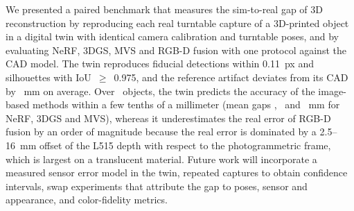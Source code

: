 We presented a paired benchmark that measures the sim-to-real gap of 3D reconstruction by reproducing each
real turntable capture of a 3D-printed object in a digital twin with identical camera calibration and
turntable poses, and by evaluating NeRF, 3DGS, MVS and RGB-D fusion with one protocol against the CAD model.
The twin reproduces fiducial detections within 0.11~px and silhouettes with IoU~$\geq$~0.975, and the
reference artifact deviates from its CAD by \printmae~mm on average. Over \nobj\ objects, the twin predicts
the accuracy of the image-based methods within a few tenths of a millimeter (mean gaps \nerfD, \gsD\ and
\mvsD~mm for NeRF, 3DGS and MVS), whereas it underestimates the real error of RGB-D fusion by an order of
magnitude because the real error is dominated by a 2.5--16~mm offset of the L515 depth with respect to the
photogrammetric frame, which is largest on a translucent material. Future work will incorporate a measured
sensor error model in the twin, repeated captures to obtain confidence intervals, swap experiments that
attribute the gap to poses, sensor and appearance, and color-fidelity metrics.
